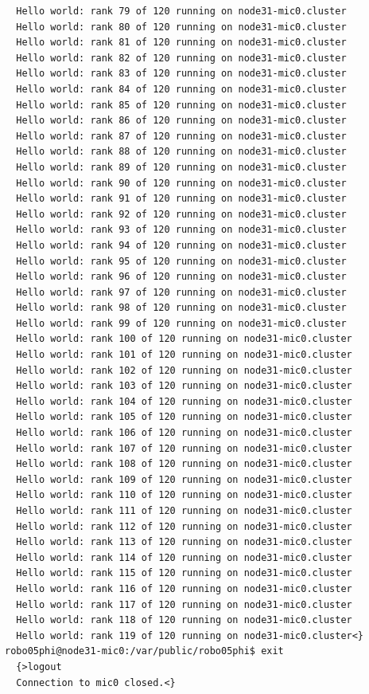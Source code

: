 \documentclass[pscyr,10pt]{hedlab}
\begin{document}
\begin{lstlisting}
  Hello world: rank 79 of 120 running on node31-mic0.cluster
  Hello world: rank 80 of 120 running on node31-mic0.cluster
  Hello world: rank 81 of 120 running on node31-mic0.cluster
  Hello world: rank 82 of 120 running on node31-mic0.cluster
  Hello world: rank 83 of 120 running on node31-mic0.cluster
  Hello world: rank 84 of 120 running on node31-mic0.cluster
  Hello world: rank 85 of 120 running on node31-mic0.cluster
  Hello world: rank 86 of 120 running on node31-mic0.cluster
  Hello world: rank 87 of 120 running on node31-mic0.cluster
  Hello world: rank 88 of 120 running on node31-mic0.cluster
  Hello world: rank 89 of 120 running on node31-mic0.cluster
  Hello world: rank 90 of 120 running on node31-mic0.cluster
  Hello world: rank 91 of 120 running on node31-mic0.cluster
  Hello world: rank 92 of 120 running on node31-mic0.cluster
  Hello world: rank 93 of 120 running on node31-mic0.cluster
  Hello world: rank 94 of 120 running on node31-mic0.cluster
  Hello world: rank 95 of 120 running on node31-mic0.cluster
  Hello world: rank 96 of 120 running on node31-mic0.cluster
  Hello world: rank 97 of 120 running on node31-mic0.cluster
  Hello world: rank 98 of 120 running on node31-mic0.cluster
  Hello world: rank 99 of 120 running on node31-mic0.cluster
  Hello world: rank 100 of 120 running on node31-mic0.cluster
  Hello world: rank 101 of 120 running on node31-mic0.cluster
  Hello world: rank 102 of 120 running on node31-mic0.cluster
  Hello world: rank 103 of 120 running on node31-mic0.cluster
  Hello world: rank 104 of 120 running on node31-mic0.cluster
  Hello world: rank 105 of 120 running on node31-mic0.cluster
  Hello world: rank 106 of 120 running on node31-mic0.cluster
  Hello world: rank 107 of 120 running on node31-mic0.cluster
  Hello world: rank 108 of 120 running on node31-mic0.cluster
  Hello world: rank 109 of 120 running on node31-mic0.cluster
  Hello world: rank 110 of 120 running on node31-mic0.cluster
  Hello world: rank 111 of 120 running on node31-mic0.cluster
  Hello world: rank 112 of 120 running on node31-mic0.cluster
  Hello world: rank 113 of 120 running on node31-mic0.cluster
  Hello world: rank 114 of 120 running on node31-mic0.cluster
  Hello world: rank 115 of 120 running on node31-mic0.cluster
  Hello world: rank 116 of 120 running on node31-mic0.cluster
  Hello world: rank 117 of 120 running on node31-mic0.cluster
  Hello world: rank 118 of 120 running on node31-mic0.cluster
  Hello world: rank 119 of 120 running on node31-mic0.cluster<}
robo05phi@node31-mic0:/var/public/robo05phi$ exit 
  {>logout
  Connection to mic0 closed.<}
\end{lstlisting}
\end{document}
